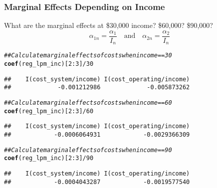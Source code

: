 \documentclass{beamer}\usepackage[]{graphicx}\usepackage[]{color}
\makeatletter
\newcommand{\hlnum}[1]{\textcolor[rgb]{0.686,0.059,0.569}{#1}}%
\newcommand{\hlcom}[1]{\textcolor[rgb]{0.678,0.584,0.686}{\textit{#1}}}%
\newcommand{\hlopt}[1]{\textcolor[rgb]{0,0,0}{#1}}%
\newcommand{\hlstd}[1]{\textcolor[rgb]{0.345,0.345,0.345}{#1}}%
\newcommand{\hlkwd}[1]{\textcolor[rgb]{0.737,0.353,0.396}{\textbf{#1}}}%
\newenvironment{kframe}{%
 \def\at@end@of@kframe{}%
 \ifinner\ifhmode%
  \def\at@end@of@kframe{\end{minipage}}%
  \begin{minipage}{\columnwidth}%
 \fi\fi%
 \def\FrameCommand##1{\hskip\@totalleftmargin \hskip-\fboxsep
 \colorbox{shadecolor}{##1}\hskip-\fboxsep
     \hskip-\linewidth \hskip-\@totalleftmargin \hskip\columnwidth}%
 \MakeFramed {\advance\hsize-\width
   \@totalleftmargin\z@ \linewidth\hsize
   \@setminipage}}%
 {\par\unskip\endMakeFramed%
 \at@end@of@kframe}
\newenvironment{knitrout}{}{} %
\makeatother
\begin{document}
\begin{frame}[fragile]\frametitle{Marginal Effects Depending on Income}
    What are the marginal effects at \$30,000 income? \$60,000? \$90,000?
    $$\alpha_{1n} = \frac{\alpha_1}{I_n} \quad \text{and} \quad \alpha_{2n} = \frac{\alpha_2}{I_n}$$
\begin{knitrout}\footnotesize
{}\color{fgcolor}\begin{kframe}
\begin{alltt}
\hlcom{## Calculate marginal effects of costs when income == 30}
\hlkwd{coef}\hlstd{(reg_lpm_inc)[}\hlnum{2}\hlopt{:}\hlnum{3}\hlstd{]} \hlopt{/} \hlnum{30}
\end{alltt}
\begin{verbatim}
##    I(cost_system/income) I(cost_operating/income) 
##             -0.001212986             -0.005873262
\end{verbatim}
\begin{alltt}
\hlcom{## Calculate marginal effects of costs when income == 60}
\hlkwd{coef}\hlstd{(reg_lpm_inc)[}\hlnum{2}\hlopt{:}\hlnum{3}\hlstd{]} \hlopt{/} \hlnum{60}
\end{alltt}
\begin{verbatim}
##    I(cost_system/income) I(cost_operating/income) 
##            -0.0006064931            -0.0029366309
\end{verbatim}
\begin{alltt}
\hlcom{## Calculate marginal effects of costs when income == 90}
\hlkwd{coef}\hlstd{(reg_lpm_inc)[}\hlnum{2}\hlopt{:}\hlnum{3}\hlstd{]} \hlopt{/} \hlnum{90}
\end{alltt}
\begin{verbatim}
##    I(cost_system/income) I(cost_operating/income) 
##            -0.0004043287            -0.0019577540
\end{verbatim}
\end{kframe}
\end{knitrout}
\end{frame}
\end{document}
